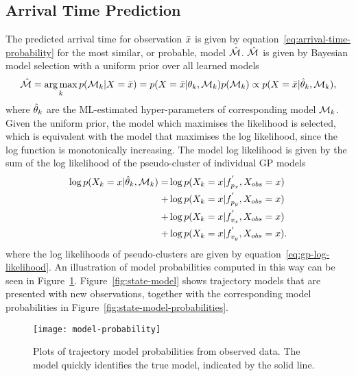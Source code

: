 \subsection{Arrival Time Prediction}
The predicted arrival time for observation $\bar{x}$
is given by equation~\ref{eq:arrival-time-probability} for the most similar, 
or probable, model $\hat{\mathcal{M}}$. $\hat{\mathcal{M}}$ is given by Bayesian model 
selection with a uniform prior over all learned models
\begin{equation}
  \label{arrival-time-model-selection}
  \hat{\mathcal{M}} = \operatorname*{arg\,max}_k
  p(\mathcal{M}_k \vert X = \bar{x}) =
  p(X = \bar{x} \vert \theta_{k}, \mathcal{M}_k)
  p(\mathcal{M}_k) \propto
  p(X = \bar{x} \vert \hat{\theta}_{k}, \mathcal{M}_k),
\end{equation}
where $\hat{\theta}_{k}$ are the ML-estimated
hyper-parameters of corresponding model $\mathcal{M}_{k}$.
Given the uniform prior, the model which maximises the likelihood is
selected, which is equivalent with the model that maximises the log
likelihood, since the log function is monotonically increasing. The
model log likelihood is given by the sum of the log likelihood of the
pseudo-cluster of individual GP models
\begin{equation}
  \label{eq:model-log-likelihood}
  \begin{split}
    \log p(X_{k} = x \vert \hat{\theta}_{k}, \mathcal{M}_k)  
    = & \log p(X_{k} = x \vert f^{'}_{p_x}, X_{obs} = x) \\
    + & \log p(X_{k} = x \vert f^{'}_{p_y}, X_{obs} = x) \\
    + & \log p(X_{k} = x \vert f^{'}_{v_x}, X_{obs} = x) \\
    + & \log p(X_{k} = x \vert f^{'}_{v_y}, X_{obs} = x).
  \end{split}
\end{equation}
where the log likelihoods of pseudo-clusters are given
by equation~\ref{eq:gp-log-likelihood}. An illustration of model
probabilities computed in this way can be
seen in Figure~\ref{fig:model-probability}. Figure~\ref{fig:state-model} 
shows trajectory models that are presented with new
observations, together with the corresponding model
probabilities in Figure~\ref{fig:state-model-probabilities}.
\begin{figure}
  \centering
  \texttt{[image: model-probability]}
  \caption{Plots of trajectory model probabilities from observed data.
    The model quickly identifies the true model, indicated by the
    solid line.}\label{fig:model-probability}
\end{figure}
